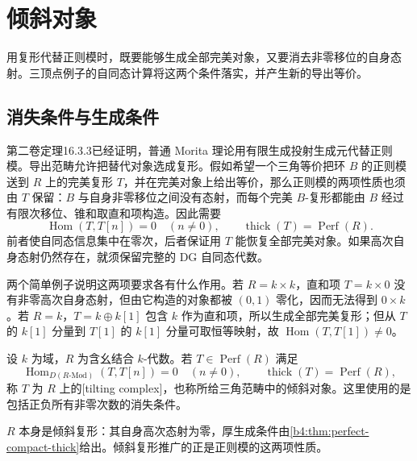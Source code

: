 
\section{倾斜对象}
\label{b4:sec:2003}

用复形代替正则模时，既要能够生成全部完美对象，又要消去非零移位的自身态射。三顶点例子的自同态计算将这两个条件落实，并产生新的导出等价。


%
%

\subsection{消失条件与生成条件}
\label{b4:subsec:2003:01}

第二卷定理16.3.3已经证明，普通 Morita 理论用有限生成投射生成元代替正则模。导出范畴允许把替代对象选成复形。假如希望一个三角等价把环 \(B\) 的正则模送到 \(R\) 上的完美复形 \(T\)，并在完美对象上给出等价，那么正则模的两项性质也须由 \(T\) 保留：\(B\) 与自身非零移位之间没有态射，而每个完美 \(B\)-复形都能由 \(B\) 经过有限次移位、锥和取直和项构造。因此需要
\[
	\operatorname{Hom}(T,T[n])=0\quad(n\ne0),\qquad \operatorname{thick}(T)=\operatorname{Perf}(R).
\]
前者使自同态信息集中在零次，后者保证用 \(T\) 能恢复全部完美对象。如果高次自身态射仍然存在，就须保留完整的 DG 自同态代数。

\ProseParagraphBreak
两个简单例子说明这两项要求各有什么作用。若 \(R=k\times k\)，直和项 \(T=k\times0\) 没有非零高次自身态射，但由它构造的对象都被 \((0,1)\) 零化，因而无法得到 \(0\times k\)。若 \(R=k\)，\(T=k\oplus k[1]\) 包含 \(k\) 作为直和项，所以生成全部完美复形；但从 \(T\) 的 \(k[1]\) 分量到 \(T[1]\) 的 \(k[1]\) 分量可取恒等映射，故 \(\operatorname{Hom}(T,T[1])\ne0\)。

\begin{definition}\label{b4:def:tilting-complex}
	设 \(k\) 为域，\(R\) 为含幺结合 \(k\)-代数。若 \(T\in\operatorname{Perf}(R)\) 满足
	\[
		\operatorname{Hom}_{D(R\text{-}\mathrm{Mod})}(T,T[n])=0 \quad(n\ne0),\qquad \operatorname{thick}(T)=\operatorname{Perf}(R),
	\]
	称 \(T\) 为 \(R\) 上的[tilting complex]，也称所给三角范畴中的倾斜对象。这里使用的是包括正负所有非零次数的消失条件。
\end{definition}

\(R\) 本身是倾斜复形：其自身高次态射为零，厚生成条件由\cref{b4:thm:perfect-compact-thick}给出。倾斜复形推广的正是正则模的这两项性质。

